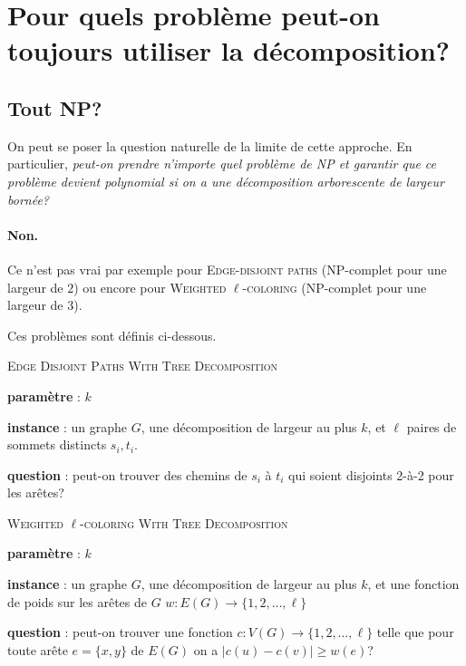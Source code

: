 \documentclass[a4paper,12pt]{article}
\theoremstyle{definition}
\theoremstyle{remark}
\begin{document}

\section{Pour quels problème peut-on toujours utiliser la décomposition?}
\label{sec:TractableBtwMSO}

\subsection*{Tout NP?}
On peut se poser la question naturelle de la limite de cette
approche. En particulier, \emph{peut-on prendre n'importe quel problème de NP et garantir que ce
problème devient polynomial si on a une décomposition arborescente de
largeur bornée?}

\paragraph{Non.} Ce n'est pas vrai par exemple pour \textsc{Edge-disjoint paths}
(NP-complet pour une largeur de $2$)
ou encore 
pour \textsc{Weighted $\ell$-coloring} (NP-complet pour une largeur de
$3$).

Ces problèmes sont définis ci-dessous.
\begin{framed}\textsc{Edge Disjoint Paths With
  Tree Decomposition}
  \begin{compactitem}
  \item \textbf{paramètre} : $k$
  \item \textbf{instance} : un graphe $G$, une décomposition de
    largeur au plus $k$, et $\ell$ paires de sommets distincts $s_i,t_i$.
  \item \textbf{question} : peut-on trouver des chemins de $s_i$ à
    $t_i$ qui soient disjoints 2-à-2 
    pour les arêtes?
  \end{compactitem}
\end{framed}

\begin{framed}
  \textsc{Weighted $\ell$-coloring With
  Tree Decomposition}
  \begin{compactitem}
  \item \textbf{paramètre} : $k$
  \item \textbf{instance} : un graphe $G$, une décomposition de
    largeur au plus $k$, et une fonction de poids sur les arêtes de
    $G$ $w:E(G) \to \{1,2,\ldots,\ell\}$
  \item \textbf{question} : peut-on trouver une fonction $c:V(G)\to
    \{1,2,\ldots,\ell\}$ telle que pour toute arête $e=\{x,y\}$ de
    $E(G)$ on a $|c(u)-c(v)|\geq w(e)$?
  \end{compactitem}
\end{framed}
\end{document}
